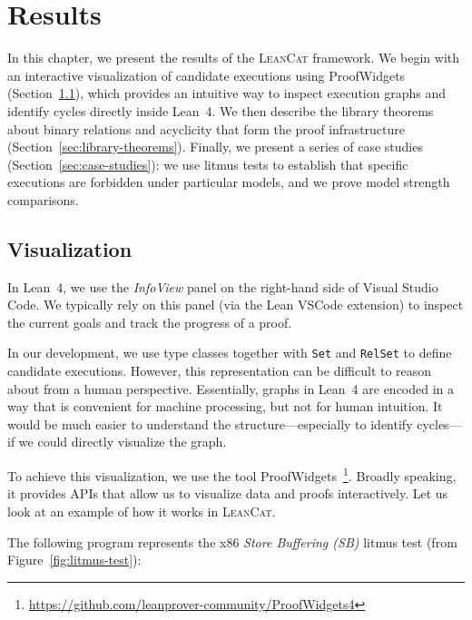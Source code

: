 \chapter{Results}
\label{chapter:results}

In this chapter, we present the results of the \textsc{LeanCat} framework. We begin with an interactive visualization of candidate executions using ProofWidgets (Section~\ref{sec:visualization}), which provides an intuitive way to inspect execution graphs and identify cycles directly inside Lean~4. We then describe the library theorems about binary relations and acyclicity that form the proof infrastructure (Section~\ref{sec:library-theorems}). Finally, we present a series of case studies (Section~\ref{sec:case-studies}): we use litmus tests to establish that specific executions are forbidden under particular models, and we prove model strength comparisons.

\section{Visualization}
\label{sec:visualization}

In Lean~4, we use the \emph{InfoView} panel on the right-hand side of Visual Studio Code. We typically rely on this panel (via the Lean VSCode extension) to inspect the current goals and track the progress of a proof.

In our development, we use type classes together with \texttt{Set} and \texttt{RelSet} to define candidate executions. However, this representation can be difficult to reason about from a human perspective. Essentially, graphs in Lean~4 are encoded in a way that is convenient for machine processing, but not for human intuition. It would be much easier to understand the structure—especially to identify cycles—if we could directly visualize the graph.

To achieve this visualization, we use the tool ProofWidgets~\citep{nawrocki2023proofwidgets}\footnote{\url{https://github.com/leanprover-community/ProofWidgets4}}. Broadly speaking, it provides APIs that allow us to visualize data and proofs interactively. Let us look at an example of how it works in \textsc{LeanCat}.

The following program represents the x86 \emph{Store Buffering (SB)} litmus test (from Figure~\ref{fig:litmus-test}):

